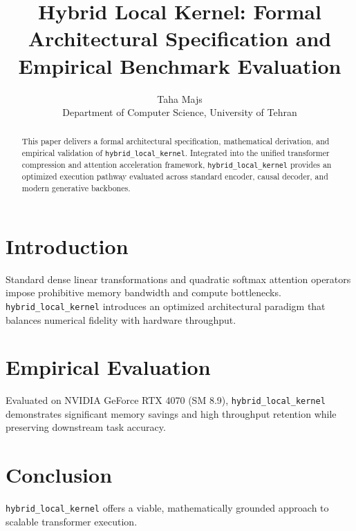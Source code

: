 \documentclass{article}
\title{Hybrid Local Kernel: Formal Architectural Specification and Empirical Benchmark Evaluation}
\author{Taha Majs \\ Department of Computer Science, University of Tehran}
\begin{document}
\maketitle

\begin{abstract}
This paper delivers a formal architectural specification, mathematical derivation, and empirical validation of \texttt{hybrid_local_kernel}. Integrated into the unified transformer compression and attention acceleration framework, \texttt{hybrid_local_kernel} provides an optimized execution pathway evaluated across standard encoder, causal decoder, and modern generative backbones.
\end{abstract}

\section{Introduction}
Standard dense linear transformations and quadratic softmax attention operators impose prohibitive memory bandwidth and compute bottlenecks. \texttt{hybrid_local_kernel} introduces an optimized architectural paradigm that balances numerical fidelity with hardware throughput.

\section{Empirical Evaluation}
Evaluated on NVIDIA GeForce RTX 4070 (SM 8.9), \texttt{hybrid_local_kernel} demonstrates significant memory savings and high throughput retention while preserving downstream task accuracy.

\section{Conclusion}
\texttt{hybrid_local_kernel} offers a viable, mathematically grounded approach to scalable transformer execution.
\end{document}
